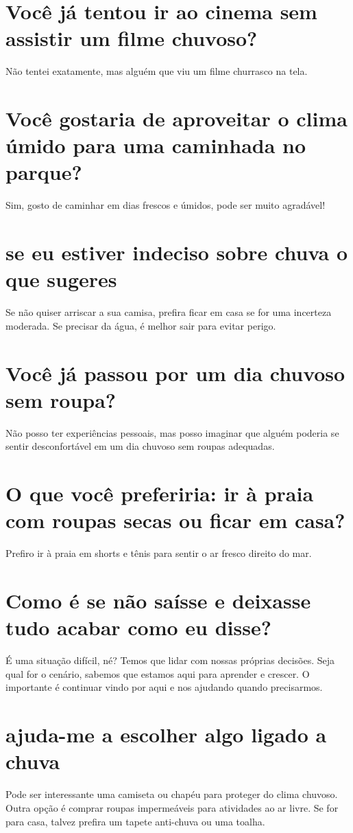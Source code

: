 \documentclass[11pt,a4paper]{article}
\begin{document}
\section{Você já tentou ir ao cinema sem assistir um filme chuvoso?}
Não tentei exatamente, mas alguém que viu um filme churrasco na tela.

\section{Você gostaria de aproveitar o clima úmido para uma caminhada no parque?}
Sim, gosto de caminhar em dias frescos e úmidos, pode ser muito agradável!

\section{se eu estiver indeciso sobre chuva o que sugeres}
Se não quiser arriscar a sua camisa, prefira ficar em casa se for uma incerteza moderada. Se precisar da água, é melhor sair para evitar perigo.

\section{Você já passou por um dia chuvoso sem roupa?}
Não posso ter experiências pessoais, mas posso imaginar que alguém poderia se sentir desconfortável em um dia chuvoso sem roupas adequadas.

\section{O que você preferiria: ir à praia com roupas secas ou ficar em casa?}
Prefiro ir à praia em shorts e tênis para sentir o ar fresco direito do mar.

\section{Como é se não saísse e deixasse tudo acabar como eu disse?}
É uma situação difícil, né? Temos que lidar com nossas próprias decisões. Seja qual for o cenário, sabemos que estamos aqui para aprender e crescer. O importante é continuar vindo por aqui e nos ajudando quando precisarmos.

\section{ajuda-me a escolher algo ligado a chuva}
Pode ser interessante uma camiseta ou chapéu para proteger do clima chuvoso. Outra opção é comprar roupas impermeáveis para atividades ao ar livre. Se for para casa, talvez prefira um tapete anti-chuva ou uma toalha.
\end{document}
